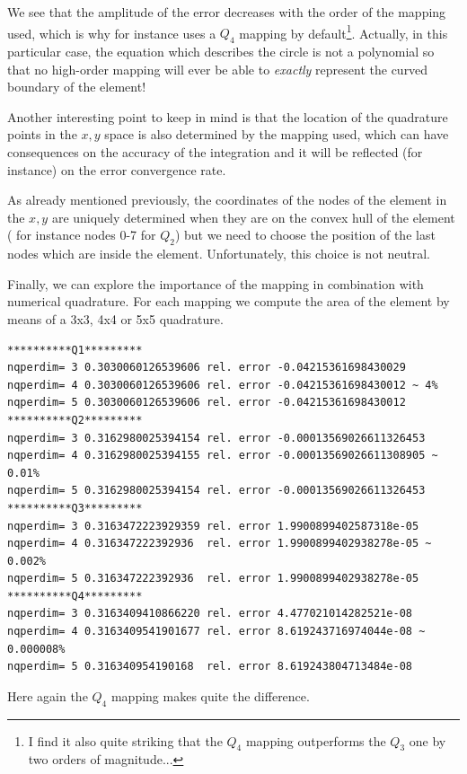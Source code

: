 We see that the amplitude of the error decreases with the order of the mapping used, 
which is why for instance \aspect uses a $Q_4$ mapping by default\footnote{I find it also quite striking 
that the $Q_4$ mapping outperforms the $Q_3$ one by two orders of magnitude...}.
Actually, in this particular case, the equation which describes the circle is not a 
polynomial so that no high-order mapping will ever be able to {\it exactly} 
represent the curved boundary of the element!

Another interesting point to keep in mind is that the location of the quadrature points
in the $x,y$ space is also determined by the mapping used, which can have consequences
on the accuracy of the integration and it will be reflected (for instance) on the 
error convergence rate.

As already mentioned previously, 
the coordinates of the nodes of the element in the $x,y$ are 
uniquely determined when they are on the convex hull of the element (
for instance nodes 0-7 for $Q_2$) but we need to choose the position 
of the last nodes which are inside the element. Unfortunately, this choice is 
not neutral. 

Finally, we can explore the importance of the mapping in combination with 
numerical quadrature. For each mapping we compute the area of the element
by means of a 3x3, 4x4 or 5x5 quadrature.

\begin{verbatim}
**********Q1*********
nqperdim= 3 0.3030060126539606 rel. error -0.04215361698430029
nqperdim= 4 0.3030060126539606 rel. error -0.04215361698430012 ~ 4%
nqperdim= 5 0.3030060126539606 rel. error -0.04215361698430012
**********Q2*********
nqperdim= 3 0.3162980025394154 rel. error -0.00013569026611326453
nqperdim= 4 0.3162980025394155 rel. error -0.00013569026611308905 ~ 0.01%
nqperdim= 5 0.3162980025394154 rel. error -0.00013569026611326453
**********Q3*********
nqperdim= 3 0.3163472223929359 rel. error 1.9900899402587318e-05
nqperdim= 4 0.316347222392936  rel. error 1.9900899402938278e-05 ~ 0.002%
nqperdim= 5 0.316347222392936  rel. error 1.9900899402938278e-05
**********Q4*********
nqperdim= 3 0.3163409410866220 rel. error 4.477021014282521e-08
nqperdim= 4 0.3163409541901677 rel. error 8.619243716974044e-08 ~ 0.000008%
nqperdim= 5 0.316340954190168  rel. error 8.619243804713484e-08
\end{verbatim}

Here again the $Q_4$ mapping makes quite the difference. 

\newpage
